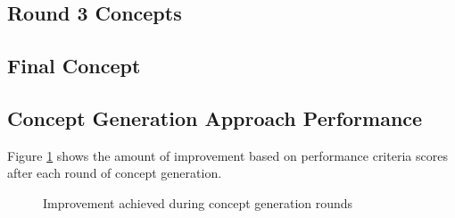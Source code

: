 \subsection{Round 3 Concepts}

\subsection{Final Concept}

\subsection{Concept Generation Approach Performance}

Figure \ref{fig:improvement} shows the amount of improvement based on performance criteria scores after each round of concept generation.

\begin{figure}[H]
    \centering
    \caption{Improvement achieved during concept generation rounds}
    \label{fig:improvement}
\end{figure}

